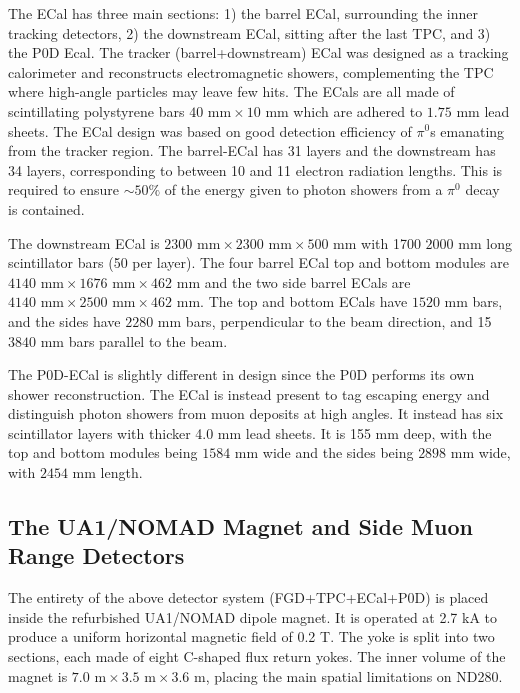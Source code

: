 The ECal has three main sections: 1) the barrel ECal, surrounding the inner tracking detectors, 2) the downstream ECal, sitting after the last TPC, and 3) the P0D Ecal. The tracker (barrel+downstream) ECal was designed as a tracking calorimeter and reconstructs electromagnetic showers, complementing the TPC where high-angle particles may leave few hits.  The ECals are all made of scintillating polystyrene bars $40\text{ mm}\times10\text{ mm}$ which are adhered to $1.75\text{ mm}$ lead sheets. The ECal design was based on good detection efficiency of $\pi^0$s emanating from the tracker region. The barrel-ECal has 31 layers and the downstream has 34 layers, corresponding to between 10 and 11 electron radiation lengths. This is required to ensure $\sim50\%$ of the energy given to photon showers from a $\pi^0$ decay is contained. 

The downstream ECal is $2300\text{ mm}\times2300\text{ mm}\times500\text{ mm}$ with 1700 $2000\text{ mm}$ long scintillator bars (50 per layer). The four barrel ECal top and bottom modules are $4140\text{ mm}\times1676\text{ mm}\times462\text{ mm}$ and the two side barrel ECals are\newline$4140\text{ mm}\times2500\text{ mm}\times462\text{ mm}$. The top and bottom ECals have $1520\text{ mm}$ bars, and the sides have $2280\text{ mm}$ bars, perpendicular to the beam direction, and 15 $3840\text{ mm}$ bars parallel to the beam. 

The P0D-ECal is slightly different in design since the P0D performs its own shower reconstruction. The ECal is instead present to tag escaping energy and distinguish photon showers from muon deposits at high angles. It instead has six scintillator layers with thicker 4.0 mm lead sheets. It is 155 mm deep, with the top and bottom modules being $1584\text{ mm}$ wide and the sides being $2898\text{ mm}$ wide, with $2454\text{ mm}$ length.

\subsection{The UA1/NOMAD Magnet and Side Muon Range Detectors}
The entirety of the above detector system (FGD+TPC+ECal+P0D) is placed inside the refurbished UA1/NOMAD dipole magnet. It is operated at 2.7 kA to produce a uniform horizontal magnetic field of 0.2 T. The yoke is split into two sections, each made of eight C-shaped flux return yokes. The inner volume of the magnet is $7.0\text{ m}\times3.5\text{ m}\times3.6\text{ m}$, placing the main spatial limitations on ND280.

